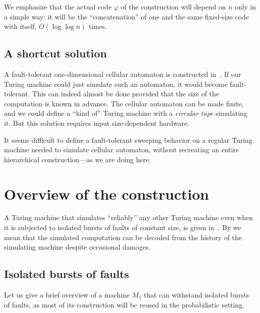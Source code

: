 \documentclass[11pt]{memoir}
\theoremstyle{definition} %
\begin{document}
We emphasize that the actual
code \( \varphi \) of the construction will depend on \( n \) only in a simple way:
it will be the ``concatenation'' of one and the same fixed-size
code with itself, \( O(\log\log n) \) times.

\subsection{A shortcut solution}

A fault-tolerant one-dimensional cellular automaton is constructed
in~\cite{GacsSorg01}.
If our Turing machine could just simulate such an automaton, it would become
fault-tolerant.
This can indeed almost be done provided that the size of the computation is known in advance.
The cellular automaton can be made finite, and we could define
a ``kind of'' Turing machine with a \emph{circular tape} simulating it.
But this solution requires input size-dependent hardware.

It seems difficult to define a fault-tolerant sweeping 
behavior on a regular Turing machine needed to 
simulate cellular automaton, without recreating
an entire hierarchical construction---as we are doing here.


\section{Overview of the construction}

A Turing machine that simulates ``reliably'' any other
Turing machine even when it is subjected to isolated bursts of faults of constant size,
is given in~\cite{burstyTuring13}.
By  we mean that the 
simulated computation can be decoded from the history
of the simulating machine despite occasional damages.


\subsection{Isolated bursts of faults}\label{sec:bursts}

Let us give a brief overview of a machine \( M_{1} \) that
can withstand isolated bursts of faults, as most of its construction will be reused
in the probabilistic setting.
\end{document}
